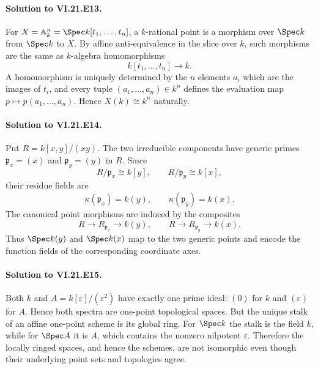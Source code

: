 \paragraph{Solution to VI.21.E13.}
\begin{solution}
For $X=\mathbb A^n_k=\Spec k[t_1,\dots,t_n]$, a $k$-rational point is a morphism over
$\Spec k$ from $\Spec k$ to $X$.  By affine anti-equivalence in the slice over $k$, such morphisms
are the same as $k$-algebra homomorphisms
\[
k[t_1,\dots,t_n]\longrightarrow k.
\]
A homomorphism is uniquely determined by the $n$ elements $a_i$ which are the images of $t_i$,
and every tuple $(a_1,\dots,a_n)\in k^n$ defines the evaluation map
$p\mapsto p(a_1,\dots,a_n)$.  Hence $X(k)\cong k^n$ naturally.
\end{solution}

\paragraph{Solution to VI.21.E14.}
\begin{solution}
Put $R=k[x,y]/(xy)$.  The two irreducible components have generic primes
$\mathfrak p_x=(x)$ and $\mathfrak p_y=(y)$ in $R$.  Since
\[
R/\mathfrak p_x\cong k[y],\qquad R/\mathfrak p_y\cong k[x],
\]
their residue fields are
\[
\kappa(\mathfrak p_x)=k(y),\qquad \kappa(\mathfrak p_y)=k(x).
\]
The canonical point morphisms are induced by the composites
\[
R\to R_{\mathfrak p_x}\to k(y),\qquad
R\to R_{\mathfrak p_y}\to k(x).
\]
Thus $\Spec k(y)$ and $\Spec k(x)$ map to the two generic points and encode the function fields
of the corresponding coordinate axes.
\end{solution}

\paragraph{Solution to VI.21.E15.}
\begin{solution}
Both $k$ and $A=k[\varepsilon]/(\varepsilon^2)$ have exactly one prime ideal: $(0)$ for
$k$ and $(\varepsilon)$ for $A$.  Hence both spectra are one-point topological spaces.  But the
unique stalk of an affine one-point scheme is its global ring.  For $\Spec k$ the stalk is the
field $k$, while for $\Spec A$ it is $A$, which contains the nonzero nilpotent $\varepsilon$.
Therefore the locally ringed spaces, and hence the schemes, are not isomorphic even though their
underlying point sets and topologies agree.
\end{solution}

